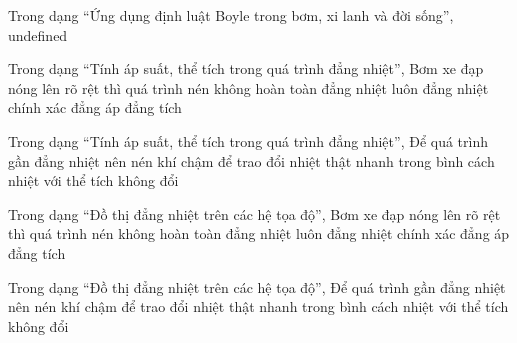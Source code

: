 \begin{bt}
Trong dạng “Ứng dụng định luật Boyle trong bơm, xi lanh và đời sống”, undefined
\end{bt}

\begin{ex}
Trong dạng “Tính áp suất, thể tích trong quá trình đẳng nhiệt”, Bơm xe đạp nóng lên rõ rệt thì quá trình nén
\choice
{\True không hoàn toàn đẳng nhiệt}
{luôn đẳng nhiệt chính xác}
{đẳng áp}
{đẳng tích}
\end{ex}

\begin{ex}
Trong dạng “Tính áp suất, thể tích trong quá trình đẳng nhiệt”, Để quá trình gần đẳng nhiệt nên nén khí
\choice
{\True chậm để trao đổi nhiệt}
{thật nhanh}
{trong bình cách nhiệt}
{với thể tích không đổi}
\end{ex}

\begin{ex}
Trong dạng “Đồ thị đẳng nhiệt trên các hệ tọa độ”, Bơm xe đạp nóng lên rõ rệt thì quá trình nén
\choice
{\True không hoàn toàn đẳng nhiệt}
{luôn đẳng nhiệt chính xác}
{đẳng áp}
{đẳng tích}
\end{ex}

\begin{ex}
Trong dạng “Đồ thị đẳng nhiệt trên các hệ tọa độ”, Để quá trình gần đẳng nhiệt nên nén khí
\choice
{\True chậm để trao đổi nhiệt}
{thật nhanh}
{trong bình cách nhiệt}
{với thể tích không đổi}
\end{ex}
